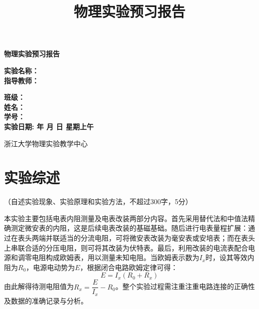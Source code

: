 \documentclass[10pt,a4paper]{ctexart}
\title{\xiaochu\textbf{物理实验预习报告}}
\author{}
\date{}
\newcommand{\myspace}[1]{\par\vspace{#1\baselineskip}} %
\newcommand{\xiaochu}{\fontsize{36pt}{42pt}\selectfont}
\newcommand{\sanhao}{\fontsize{16pt}{20pt}\selectfont}
\newcommand{\sihao}{\fontsize{14pt}{18pt}\selectfont}
\newcommand{\xiaosi}{\fontsize{12pt}{16pt}\selectfont}
\begin{document}
\vspace*{36pt} %

\begin{center}   
    \xiaochu\textbf{物理实验预习报告}
    \vspace{13pt}
    \vspace{13pt}
    \vspace{13pt}
    \vspace{13pt}
    
    \sanhao\textbf{实验名称：\underline{}} \\[10pt]
    \sanhao\textbf{指导教师：\underline{}} \\[30pt]
    
    \myspace{6}
    
   \sihao\textbf{班级：\underline{\makebox[6cm]{}}} \\[10pt]
    \sihao\textbf{姓名：\underline{\makebox[6cm]{}}} \\[10pt]
    \sihao\textbf{学号：\underline{\makebox[6cm]{}}} \\[30pt]
    
   \sihao\textbf{实验日期: 
   \underline{}  年 
   \underline{}月
   \underline{}日  
   星期\underline{}上午}
    
    \vspace{18pt}
    \sihao 浙江大学物理实验教学中心
    
\end{center}

\newpage

    \section{实验综述}
    
    \xiaosi （自述实验现象、实验原理和实验方法，不超过300字，5分）

本实验主要包括电表内阻测量及电表改装两部分内容。首先采用替代法和中值法精确测定微安表的内阻，这是后续电表改装的基磁基础。随后进行电表量程扩展：通过在表头两端并联适当的分流电阻，可将微安表改装为毫安表或安培表；而在表头上串联合适的分压电阻，则可将其改装为伏特表。最后，利用改装的电流表配合电源和调零电阻构成欧姆表，用以测量未知电阻。当欧姆表示数为$I_x$时，设其等效内阻为$R_0$，电源电动势为$E$，根据闭合电路欧姆定律可得：
$$ E = I_x(R_0 + R_x) $$
由此解得待测电阻值为$R_x = \dfrac{E}{I_x} - R_0$。整个实验过程需注重注重电路连接的正确性及数据的准确记录与分析。
\myspace{2}
    
\end{document}
